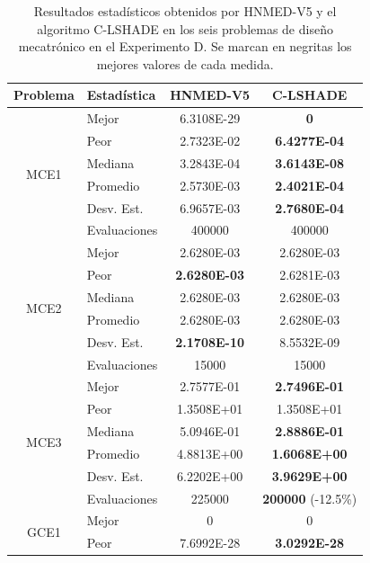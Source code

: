 \begin{table}
	\centering
	\caption[Resultados estadísticos obtenidos por HNMED-V5 y el algoritmo C-LSHADE
	en los seis problemas de diseño mecatrónico en el Experimento D]{Resultados estadísticos obtenidos por HNMED-V5 y el algoritmo C-LSHADE
		en los seis problemas de diseño mecatrónico en el Experimento D. Se marcan en negritas los
		mejores valores de cada medida.}\label{tab:Resultados estadísticos obtenidos por HNMED-V5 y el algoritmo C-LSHADE en los seis problemas de diseño mecatrónico}
	\begin{tabular}{clcc} 
		\hline
		Problema              & Estadística   & HNMED-V5 & C-LSHADE  \\ 
		\hline
		\multirow{6}{*}{MCE1} & Mejor        & 6.3108E-29 & \textbf{0 }      \\
		& Peor         &2.7323E-02&  \textbf{6.4277E-04}  \\
		& Mediana      &3.2843E-04&\textbf{3.6143E-08}     \\
		& Promedio     &2.5730E-03& \textbf{ 2.4021E-04 } \\
		& Desv. Est.   &6.9657E-03&\textbf{ 2.7680E-04}\\
		& Evaluaciones &400000   &  400000       \\
		\hline
		\multirow{6}{*}{MCE2} & Mejor        &2.6280E-03&2.6280E-03
		\\
		& Peor         &\textbf{2.6280E-03}&2.6281E-03                \\
		& Mediana      &2.6280E-03&2.6280E-03   \\
		& Promedio     &2.6280E-03&2.6280E-03    \\
		& Desv. Est.   &\textbf{2.1708E-10}&8.5532E-09 \\
		& Evaluaciones &15000&15000                \\
		\hline
		\multirow{6}{*}{MCE3} & Mejor        &2.7577E-01&\textbf{2.7496E-01}  \\
		& Peor         &1.3508E+01&1.3508E+01     \\
		& Mediana      &5.0946E-01&\textbf{2.8886E-01} \\
		& Promedio     &4.8813E+00&\textbf{1.6068E+00}\\
		& Desv. Est.   &6.2202E+00&\textbf{3.9629E+00}\\
		& Evaluaciones &225000& \textbf{200000} (-12.5\%) \\
		\hline
		\multirow{6}{*}{GCE1} & Mejor        &0&0\\
		& Peor         &7.6992E-28&\textbf{3.0292E-28}\\

\end{tabular}
\end{table}

